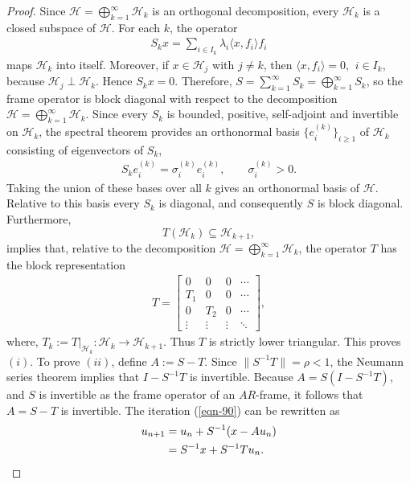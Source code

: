 \documentclass[12pt,titlepage]{amsart}
\theoremstyle{definition}
\theoremstyle{remark}
\begin{document}
\begin{proof}
Since $\mathcal H=\bigoplus_{k=1}^{\infty}\mathcal H_k$ is an
orthogonal decomposition, every $\mathcal H_k$ is a closed
subspace of $\mathcal H$. For each $k$, the operator
\begin{eqnarray*}
S_kx=\sum_{i\in I_k}\lambda_i\langle x,f_i\rangle f_i
\end{eqnarray*}
maps $\mathcal H_k$ into itself. Moreover, if $x\in\mathcal H_j$
with $j\neq k$, then $\langle x,f_i\rangle=0, \,\ i\in I_k$,
because $\mathcal H_j\perp\mathcal H_k$. Hence $S_kx=0$.
Therefore, $S=\sum_{k=1}^{\infty}S_k=\bigoplus_{k=1}^{\infty}S_k$,
so the frame operator is block diagonal with respect to the
decomposition $\mathcal H=\bigoplus_{k=1}^{\infty}\mathcal H_k$.
Since every $S_k$ is bounded, positive, self-adjoint and
invertible on $\mathcal H_k$, the spectral theorem provides an
orthonormal basis $\{e_i^{(k)}\}_{i\geq 1}$ of $\mathcal H_k$
consisting of eigenvectors of $S_k$,
\begin{eqnarray*}
S_ke_i^{(k)} = \sigma_i^{(k)}e_i^{(k)}, \qquad \sigma_i^{(k)}>0.
\end{eqnarray*}
Taking the union of these bases over all $k$ gives an orthonormal
basis of $\mathcal H$. Relative to this basis every $S_k$ is
diagonal, and consequently $S$ is block diagonal. Furthermore,
$$T(\mathcal H_k)\subseteq\mathcal H_{k+1},$$ implies that, relative
to the decomposition $\mathcal H=\bigoplus_{k=1}^{\infty}\mathcal
H_k$, the operator $T$ has the block representation
\begin{eqnarray*}
T=
\begin{bmatrix} 0&0&0&\cdots\\ T_1&0&0&\cdots\\ 0&T_2&0&\cdots\\
\vdots&\vdots&\vdots&\ddots \end{bmatrix},
\end{eqnarray*}
where, $T_k:=T|_{\mathcal H_k}:\mathcal H_k \rightarrow \mathcal
H_{k+1}$. Thus $T$ is strictly lower triangular. This proves
$(i)$. To prove $(ii)$, define $A:=S-T$. Since
$\|S^{-1}T\|=\rho<1$, the Neumann series theorem implies that
$I-S^{-1}T$ is invertible. Because $A = S(I-S^{-1}T)$, and $S$ is
invertible as the frame operator of an $AR$-frame, it follows that
$A=S-T$ is invertible. The iteration (\ref{eqn-90}) can be
rewritten as
\begin{eqnarray} \label{eqn-1000} \notag
u_{n+1} &= u_n+S^{-1}(x-Au_n)\\ &= S^{-1}x+S^{-1}Tu_n.
\end{eqnarray}


\end{proof}
\end{document}
